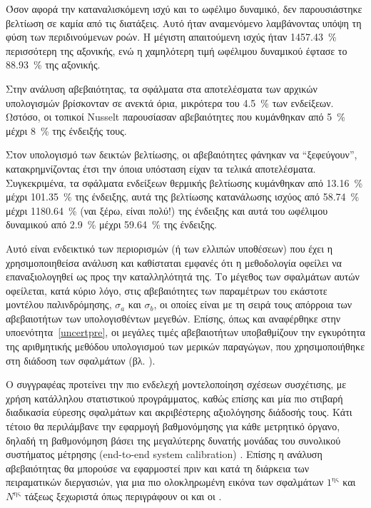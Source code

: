 Όσον αφορά την καταναλισκόμενη ισχύ και το ωφέλιμο δυναμικό, δεν παρουσιάστηκε βελτίωση σε καμία από τις διατάξεις. Αυτό ήταν αναμενόμενο λαμβάνοντας υπόψη τη φύση των περιδινούμενων ροών. Η μέγιστη απαιτούμενη ισχύς ήταν \qty{1457.43}{\percent} περισσότερη της αξονικής, ενώ η χαμηλότερη τιμή ωφέλιμου δυναμικού έφτασε το \qty{88.93}{\percent} της αξονικής.

Στην ανάλυση αβεβαιότητας, τα σφάλματα στα αποτελέσματα των αρχικών υπολογισμών βρίσκονταν σε ανεκτά όρια, μικρότερα του \qty{4.5}{\percent} των ενδείξεων. Ωστόσο, οι τοπικοί Nusselt παρουσίασαν αβεβαιότητες που κυμάνθηκαν από \qty{5}{\percent} μέχρι \qty{8}{\percent} της ένδειξής τους.

Στον υπολογισμό των δεικτών βελτίωσης, οι αβεβαιότητες φάνηκαν να \enquote{ξεφεύγουν}, κατακρημνίζοντας έτσι την όποια υπόσταση είχαν τα τελικά αποτελέσματα. Συγκεκριμένα, τα σφάλματα ενδείξεων θερμικής βελτίωσης κυμάνθηκαν από \qty{13,16}{\percent} μέχρι \qty{101,35}{\percent} της ένδειξης, αυτά της βελτίωσης κατανάλωσης ισχύος από \qty{58,74}{\percent} μέχρι \qty{1180,64}{\percent} (ναι ξέρω, είναι πολύ!) της ένδειξης και αυτά του ωφέλιμου δυναμικού από \qty{2,9}{\percent} μέχρι \qty{59,64}{\percent} της ένδειξης.

Αυτό είναι ενδεικτικό των περιορισμών (ή των ελλιπών υποθέσεων) που έχει η χρησιμοποιηθείσα ανάλυση και καθίσταται εμφανές ότι η μεθοδολογία οφείλει να επαναξιολογηθεί ως προς την καταλληλότητά της. Το μέγεθος των σφαλμάτων αυτών οφείλεται, κατά κύριο λόγο, στις αβεβαιότητες των παραμέτρων του εκάστοτε μοντέλου παλινδρόμησης, $\sigma _a$ και $\sigma _b$, οι οποίες είναι με τη σειρά τους απόρροια των αβεβαιοτήτων των υπολογισθέντων μεγεθών. Επίσης, όπως και αναφέρθηκε στην υποενότητα~\ref{uncertpre}, οι μεγάλες τιμές αβεβαιοτήτων υποβαθμίζουν την εγκυρότητα της αριθμητικής μεθόδου υπολογισμού των μερικών παραγώγων, που χρησιμοποιήθηκε στη διάδοση των σφαλμάτων (βλ. ). 

Ο συγγραφέας προτείνει την πιο ενδελεχή μοντελοποίηση σχέσεων συσχέτισης, με χρήση κατάλληλου στατιστικού προγράμματος, καθώς επίσης και μία πιο στιβαρή διαδικασία εύρεσης σφαλμάτων και ακριβέστερης αξιολόγησης διάδοσής τους. Κάτι τέτοιο θα περιλάμβανε την εφαρμογή βαθμονόμησης για κάθε μετρητικό όργανο, δηλαδή τη βαθμονόμηση βάσει της μεγαλύτερης δυνατής μονάδας του συνολικού συστήματος μέτρησης (end-to-end system calibration) \cite{2018_HughW.Coleman_BOOK}. Επίσης η ανάλυση αβεβαιότητας θα μπορούσε να εφαρμοστεί πριν και κατά τη διάρκεια των πειραματικών διεργασιών, για μια πιο ολοκληρωμένη εικόνα των σφαλμάτων $1^{\text{ης}}$ και $Ν^{\text{ης}}$ τάξεως ξεχωριστά όπως περιγράφουν οι \citeauthor{2018_HughW.Coleman_BOOK} \cite{2018_HughW.Coleman_BOOK} και οι \citeauthor{2021_Moffat_BOOK} \cite{2021_Moffat_BOOK}.

